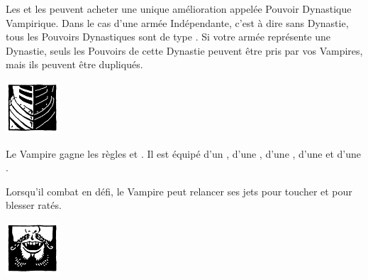 \newpage
{}

\spaceaftersection{}

Les \vampirelords{} et les \vampireheroes{} peuvent acheter une unique amélioration appelée Pouvoir Dynastique Vampirique. Dans le cas d'une armée Indépendante, c'est à dire sans Dynastie, tous les Pouvoirs Dynastiques sont de type \oneofakind{}. Si votre armée représente une Dynastie, seuls les Pouvoirs de cette Dynastie peuvent être pris par vos Vampires, mais ils peuvent être dupliqués.

\begin{multicols}{2}\raggedcolumns

\begin{center}\includegraphics[width=2cm]{pics/logo_brotherhood.png}\end{center}
\vspace*{-1.5cm}

\vspace*{-0.2cm}
\startpricelist

 Le Vampire gagne les règles \weaponmaster{} et . Il est équipé d'un \shield{}, d'une \gw{}, d'une \halberd{}, d'une \lance{} et d'une \pw{}.

 Lorsqu'il combat en défi, le Vampire peut relancer ses jets pour toucher et pour blesser ratés.

\endpricelist

\begin{center}\includegraphics[width=2cm]{pics/logo_vonkarnstein.png}\end{center}
\vspace*{-1.5cm}


\end{multicols}
